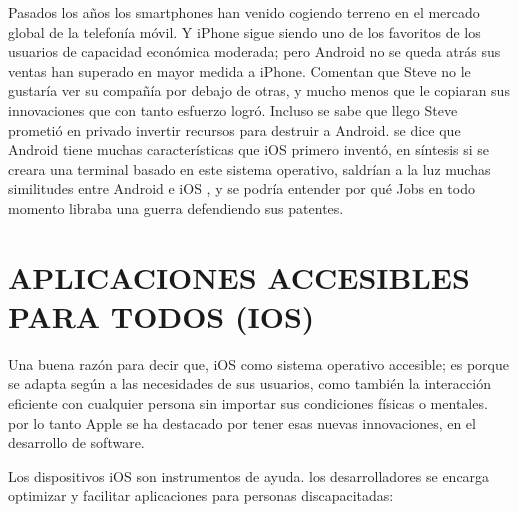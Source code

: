 Pasados los años los smartphones han venido cogiendo terreno
en el mercado global de la telefonía móvil. Y iPhone sigue siendo
uno de los favoritos de los usuarios de capacidad económica
moderada; pero Android no se queda atrás sus ventas han
superado en mayor medida a iPhone. Comentan que Steve no le
gustaría ver su compañía por debajo de otras, y mucho menos
que le copiaran sus innovaciones que con tanto esfuerzo logró.
Incluso se sabe que llego Steve prometió en privado invertir
recursos para destruir a Android. se dice que Android tiene
muchas características que iOS primero inventó, en síntesis si
se creara una terminal basado en este sistema operativo,
saldrían a la luz muchas similitudes entre Android e iOS , y se
podría entender por qué Jobs en todo momento libraba una
guerra defendiendo sus patentes.

\section*{APLICACIONES ACCESIBLES PARA TODOS (IOS)}
Una buena razón para decir que, iOS como sistema operativo
accesible; es porque se adapta según a las necesidades de sus
usuarios, como también la interacción eficiente con cualquier
persona sin importar sus condiciones físicas o mentales. por lo
tanto Apple se ha destacado por tener esas nuevas innovaciones,
en el desarrollo de software.

Los dispositivos iOS son instrumentos de ayuda. los
desarrolladores se encarga optimizar y facilitar aplicaciones
para personas discapacitadas:

